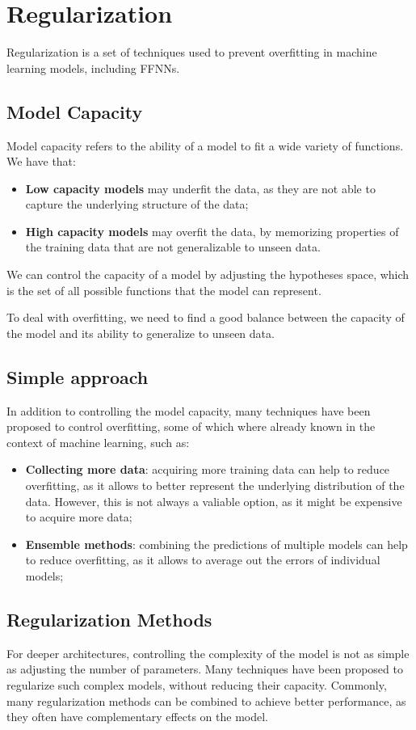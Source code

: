 \section{Regularization}
Regularization is a set of techniques used to prevent overfitting in machine learning models, including FFNNs.

\subsection{Model Capacity}
Model capacity refers to the ability of a model to fit a wide variety of functions. We have that:
\begin{itemize}
    \item \textbf{Low capacity models} may underfit the data, as they are not able to capture the underlying structure of the data;
    \item \textbf{High capacity models} may overfit the data, by memorizing properties of the training data that are not generalizable to unseen data.
\end{itemize}
We can control the capacity of a model by adjusting the hypotheses space, which is the set of all possible functions that
the model can represent.

To deal with overfitting, we need to find a good balance between the capacity of the model and its ability to generalize to unseen data.

\subsection{Simple approach}
In addition to controlling the model capacity, many techniques have been proposed to control overfitting, some of which where already known in the context of machine learning, such as:
\begin{itemize}
    \item \textbf{Collecting more data}: acquiring more training data can help to reduce overfitting, as it allows to better represent the underlying distribution of the data.
    However, this is not always a valiable option, as it might be expensive to acquire more data;
    \item \textbf{Ensemble methods}: combining the predictions of multiple models can help to reduce overfitting, as it allows to average out the errors of individual models;
\end{itemize}

\subsection{Regularization Methods}
For deeper architectures, controlling the complexity of the model is not as simple as adjusting the number of parameters.
Many techniques have been proposed to regularize such complex models, without reducing their capacity.
Commonly, many regularization methods can be combined to achieve better performance, as they often have complementary effects on the model.

